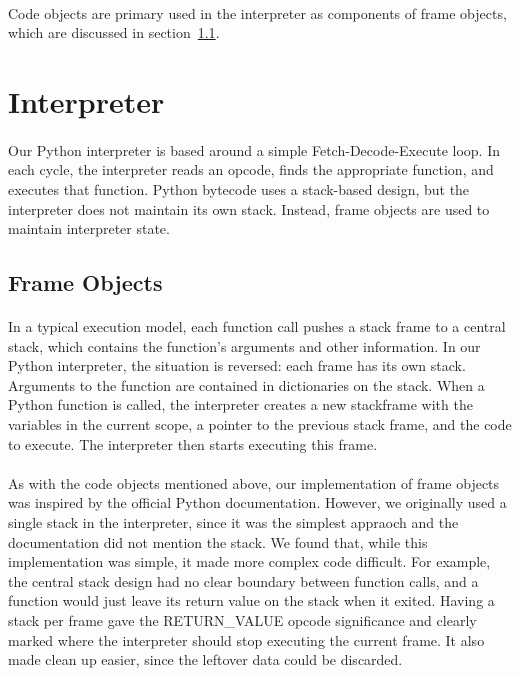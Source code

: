 \documentclass{article}
\begin{document}
\paragraph{}
Code objects are primary used in the interpreter as components of frame objects, which are discussed in section~\ref{py-frameobject}.

\section{Interpreter}\label{interpreter}

\paragraph{}
Our Python interpreter is based around a simple Fetch-Decode-Execute loop. In each cycle, the interpreter reads an opcode, finds the appropriate function, and executes that function. Python bytecode uses a stack-based design, but the interpreter does not maintain its own stack. Instead, frame objects are used to maintain interpreter state.

\subsection{Frame Objects}\label{py-frameobject}
\paragraph{}
In a typical execution model, each function call pushes a stack frame to a central stack, which contains the function's arguments and other information. In our Python interpreter, the situation is reversed: each frame has its own stack. Arguments to the function are contained in dictionaries on the stack. When a Python function is called, the interpreter creates a new stackframe with the variables in the current scope, a pointer to the previous stack frame, and the code to execute. The interpreter then starts executing this frame.

\paragraph{}
As with the code objects mentioned above, our implementation of frame objects was inspired by the official Python documentation. However, we originally used a single stack in the interpreter, since it was the simplest appraoch and the documentation did not mention the stack. We found that, while this implementation was simple, it made more complex code difficult. For example, the central stack design had no clear boundary between function calls, and a function would just leave its return value on the stack when it exited. Having a stack per frame gave the RETURN\_VALUE opcode significance and clearly marked where the interpreter should stop executing the current frame. It also made clean up easier, since the leftover data could be discarded.
\end{document}
